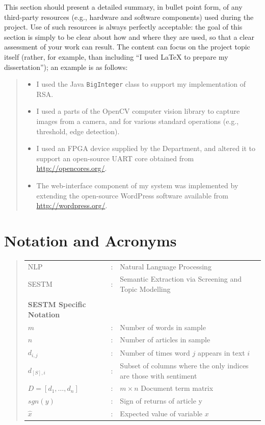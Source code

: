 \documentclass[ oneside,%
                    author={Joshua Felmeden},
                    degree={MEng},
                     title={Semantic Analysis of Financial Headlines Based on Realised Stock Returns},
                  subtitle={}]{dissertation}
\begin{document}
\noindent
This section should present a detailed summary, in bullet point form, 
of any third-party resources (e.g., hardware and software components) 
used during the project.  Use of such resources is always perfectly 
acceptable: the goal of this section is simply to be clear about how
and where they are used, so that a clear assessment of your work can
result.  The content can focus on the project topic itself (rather,
for example, than including ``I used \mbox{\LaTeX} to prepare my 
dissertation''); an example is as follows:

\begin{quote}
\noindent
\begin{itemize}
\item I used the Java {\tt BigInteger} class to support my implementation 
      of RSA.
\item I used a parts of the OpenCV computer vision library to capture 
      images from a camera, and for various standard operations (e.g., 
      threshold, edge detection).
\item I used an FPGA device supplied by the Department, and altered it 
      to support an open-source UART core obtained from 
      \url{http://opencores.org/}.
\item The web-interface component of my system was implemented by 
      extending the open-source WordPress software available from
      \url{http://wordpress.org/}.
\end{itemize}
\end{quote}


\chapter*{Notation and Acronyms}

\begin{quote}
\noindent
\begin{tabular}{lcl}
NLP               &:    &     Natural Language Processing \\
SESTM             &:    &     Semantic Extraction via Screening and Topic Modelling \\
\\
\textbf{SESTM Specific Notation} \\
$m$               &:    &     Number of words in sample \\
$n$               &:    &     Number of articles in sample \\
$d_{i,j}$         &:    &     Number of times word $j$ appears in text $i$ \\
$d_{[S],i}$       &:    &     Subset of columns where the only indices are those with sentiment \\
$D = [d_1, \dots, d_n]$ &:    & $m \times n$ Document term matrix \\
$sgn(y)$          &:    &     Sign of returns of article y \\
$\hat x$          &:    &    Expected value of variable $x$ \\
\end{tabular}
\end{quote}
\end{document}
